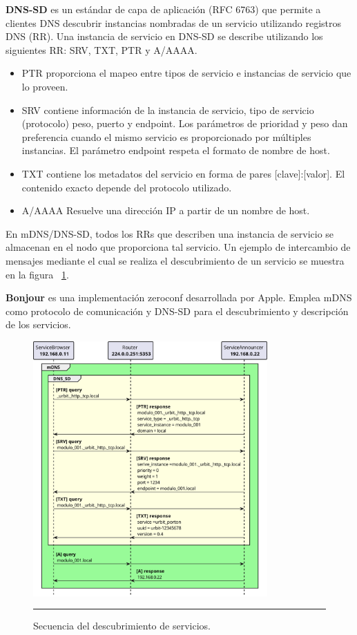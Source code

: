 \textbf{DNS-SD} es un estándar de capa de aplicación (RFC 6763) que permite a clientes DNS descubrir instancias nombradas de un servicio utilizando registros DNS (RR). Una instancia de servicio en DNS-SD se describe utilizando los siguientes RR: SRV, TXT, PTR y A/AAAA. 
\begin{itemize}
	\item PTR proporciona el mapeo entre tipos de servicio e instancias de servicio que lo proveen.
	\item SRV contiene información de la instancia de servicio, tipo de servicio (protocolo) peso, puerto y endpoint. Los parámetros de prioridad y peso dan preferencia cuando el mismo servicio es proporcionado por múltiples instancias. El parámetro endpoint respeta el formato de nombre de host.
	\item TXT contiene los metadatos del servicio en forma de pares [clave]:[valor]. El contenido exacto depende del protocolo utilizado.
	\item A/AAAA Resuelve una dirección IP a partir de un nombre de host.
\end{itemize}
En mDNS/DNS-SD, todos los RRs que describen una instancia de servicio se almacenan en el nodo que proporciona tal servicio. Un ejemplo de intercambio de mensajes mediante el cual se realiza el descubrimiento de un servicio se muestra en la figura ~\ref{fig:zeroconf_seq}.

\textbf{Bonjour} es una implementación zeroconf desarrollada por Apple. Emplea mDNS como protocolo de comunicación y DNS-SD para el descubrimiento y descripción de los servicios.

\begin{figure}[htbp]
	\centering
	\includegraphics[width=0.8\textwidth]{Figures/design/SEQ_mdns_dnssd_ink.png}
	\rule{35em}{1pt}
	\caption[Connection Diagram]{Secuencia del descubrimiento de servicios.}
	\label{fig:zeroconf_seq}
\end{figure}

